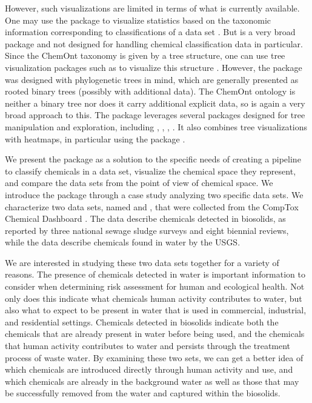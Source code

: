 \documentclass[article]{jss}
\begin{document}
However, such visualizations are limited in terms of what is currently available. One may use the   package to visualize statistics based on the taxonomic information corresponding to classifications of a data set \cite{ggplot22016} . But  is a very broad package and not designed for handling chemical classification data in particular. Since the ChemOnt taxonomy is given by a tree structure, one can use tree visualization packages such as  to visualize this structure \cite{yu2017ggtree}. However, the  package was designed with phylogenetic trees in mind, which are generally presented as rooted binary trees (possibly with additional data). The ChemOnt ontology is neither a binary tree nor does it carry additional explicit data, so  is again a very broad approach to this.  The package  leverages several  packages designed for tree manipulation and exploration, including  \cite{phytools2024revell},  \cite{phangorn2011schliep, phangorn2017schliep},  \cite{ape2019paradis},  \cite{treeio2020Wang}. It also combines tree visualizations with heatmaps, in particular using the package  \cite{complexheatmap2016gu}.

We present the package  as a solution to the specific needs of creating a pipeline to classify chemicals in a data set, visualize the chemical space they represent, and compare the data sets from the point of view of chemical space. We introduce the package through a case study analyzing two specific data sets. We characterize two data sets, named  and , that were collected from the CompTox Chemical Dashboard \cite{williams2017comptox}. The  data describe chemicals detected in biosolids, as reported by three national sewage sludge surveys and eight biennial reviews, while the  data describe chemicals found in water by the USGS.

We are interested in studying these two data sets together for a variety of reasons. The presence of chemicals detected in water is important information to consider when determining risk assessment for human and ecological health. Not only does this indicate what chemicals human activity contributes to water, but also what to expect to be present in water that is used in commercial, industrial, and residential settings. Chemicals detected in biosolids indicate both the chemicals that are already present in water before being used, and the chemicals that human activity contributes to water and persists through the treatment process of waste water. By examining these two sets, we can get a better idea of which chemicals are introduced directly through human activity and use, and which chemicals are already in the background water as well as those that may be successfully removed from the water and captured within the biosolids.
\end{document}
